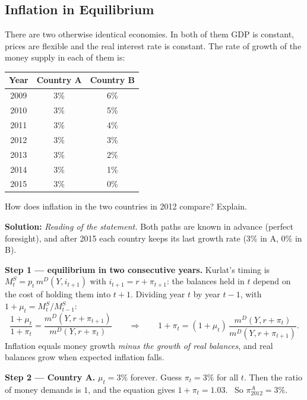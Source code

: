 \documentclass[12pt, letterpaper]{article}
\newcommand{\mD}{m^{D}}
\newcommand{\Ms}{M^{S}}
\begin{document}
\subsection{Inflation in Equilibrium}

\begin{tcolorbox}[evenbox,title={Problem 11.4 \quad Growth in the Money Supply}]
\begin{tcolorbox}[questionbox]
There are two otherwise identical economies. In both of them GDP is constant, prices are
flexible and the real interest rate is constant. The rate of growth of the money supply in each
of them is:
\begin{center}
\small
\begin{tabular}{ccc}
\toprule
Year & Country A & Country B\\
\midrule
2009 & 3\% & 6\%\\
2010 & 3\% & 5\%\\
2011 & 3\% & 4\%\\
2012 & 3\% & 3\%\\
2013 & 3\% & 2\%\\
2014 & 3\% & 1\%\\
2015 & 3\% & 0\%\\
\bottomrule
\end{tabular}
\end{center}
How does inflation in the two countries in 2012 compare? Explain.
\end{tcolorbox}

\textbf{Solution:} \emph{Reading of the statement.} Both paths are known in advance (perfect
foresight), and after 2015 each country keeps its last growth rate (3\% in A, 0\% in B).

\textbf{Step 1 --- equilibrium in two consecutive years.} Kurlat's timing is
$\Ms_t=p_t\,\mD(Y,i_{t+1})$ with $i_{t+1}=r+\pi_{t+1}$: the balances held in $t$ depend on the
cost of holding them into $t+1$. Dividing year $t$ by year $t-1$, with $1+\mu_t=\Ms_t/\Ms_{t-1}$:
\[
\frac{1+\mu_t}{1+\pi_t}=\frac{\mD(Y,r+\pi_{t+1})}{\mD(Y,r+\pi_t)}
\qquad\Longrightarrow\qquad
1+\pi_t=(1+\mu_t)\,\frac{\mD(Y,r+\pi_t)}{\mD(Y,r+\pi_{t+1})}.
\]
Inflation equals money growth \emph{minus the growth of real balances}, and real balances grow
when expected inflation falls.

\textbf{Step 2 --- Country A.} $\mu_t=3\%$ forever. Guess $\pi_t=3\%$ for all $t$. Then the ratio
of money demands is $1$, and the equation gives $1+\pi_t=1.03$. \checkmark\ So
$\pi^A_{2012}=\boxed{3\%}$.


\end{tcolorbox}
\end{document}
